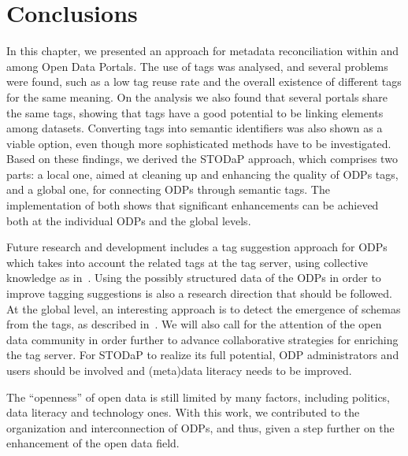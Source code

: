 \section{Conclusions}
\label{sec:stodap_conclusions}

In this chapter, we presented an approach for metadata reconciliation within and among Open Data Portals.
The use of tags was analysed, and several problems were found, such as a low tag reuse rate and the overall existence of different tags for the same meaning.
On the analysis we also found that several portals share the same tags, showing that tags have a good potential to be linking elements among datasets.
Converting tags into semantic identifiers was also shown as a viable option, even though more sophisticated methods have to be investigated. 
Based on these findings, we derived the STODaP approach, which comprises two parts: 
a local one, aimed at cleaning up and enhancing the quality of ODPs tags, and 
a global one, for connecting ODPs through semantic tags.
The implementation of both shows that significant enhancements can be achieved both at the individual ODPs and the global levels.

Future research and development includes a tag suggestion approach for ODPs which takes into account the related tags at the tag server, using collective knowledge as in~.
Using the possibly structured data of the ODPs in order to improve tagging suggestions is also a research direction that should be followed.
At the global level, an interesting approach is to detect the emergence of schemas from the tags, as described in~.
We will also call for the attention of the open data community in order further to advance collaborative strategies for enriching the tag server.
For STODaP to realize its full potential, ODP administrators and users should be involved and (meta)data literacy needs to be improved.

The ``openness'' of open data is still limited by many factors, including politics, data literacy and technology ones.
With this work, we contributed to the organization and interconnection of ODPs, and thus, given a step further on the enhancement of the open data field.




